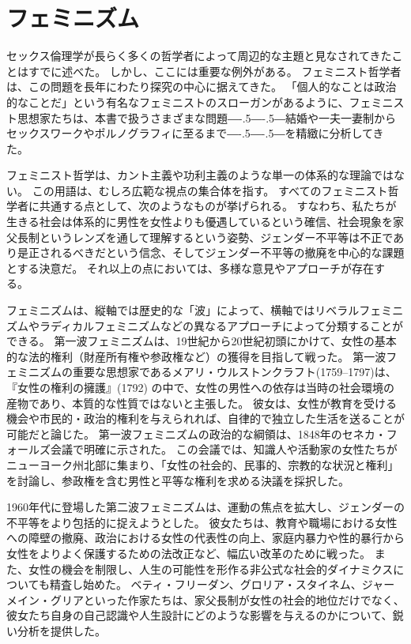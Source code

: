 \documentclass[paper=a4,book,openany]{jlreq}
\def\DDASH{―\kern-.5\zw―\kern-.5\zw―}
\begin{document}
\section{フェミニズム}

セックス倫理学が長らく多くの哲学者によって周辺的な主題と見なされてきたことはすでに述べた。
しかし、ここには重要な例外がある。
フェミニスト哲学者は、この問題を長年にわたり探究の中心に据えてきた。
「個人的なことは政治的なことだ」という有名なフェミニストのスローガンがあるように、フェミニスト思想家たちは、本書で扱うさまざまな問題{\DDASH}結婚や一夫一妻制からセックスワークやポルノグラフィに至るまで{\DDASH}を精緻に分析してきた。

フェミニスト哲学は、カント主義や功利主義のような単一の体系的な理論ではない。
この用語は、むしろ広範な視点の集合体を指す。
すべてのフェミニスト哲学者に共通する点として、次のようなものが挙げられる。
すなわち、私たちが生きる社会は体系的に男性を女性よりも優遇しているという確信、社会現象を家父長制というレンズを通して理解するという姿勢、ジェンダー不平等は不正であり是正されるべきだという信念、そしてジェンダー不平等の撤廃を中心的な課題とする決意だ。
それ以上の点においては、多様な意見やアプローチが存在する。

フェミニズムは、縦軸では歴史的な「波」によって、横軸ではリベラルフェミニズムやラディカルフェミニズムなどの異なるアプローチによって分類することができる。
第一波フェミニズムは、19世紀から20世紀初頭にかけて、女性の基本的な法的権利（財産所有権や参政権など）の獲得を目指して戦った。
第一波フェミニズムの重要な思想家であるメアリ・ウルストンクラフト(1759--1797)は、『女性の権利の擁護』(1792)\nocite{ウルストンクラーフト女性の権利}
の中で、女性の男性への依存は当時の社会環境の産物であり、本質的な性質ではないと主張した。
彼女は、女性が教育を受ける機会や市民的・政治的権利を与えられれば、自律的で独立した生活を送ることが可能だと論じた\citep{wollstonecraft93:_vindic_right_woman}。
第一波フェミニズムの政治的な綱領は、1848年のセネカ・フォールズ会議で明確に示された。
この会議では、知識人や活動家の女性たちがニューヨーク州北部に集まり、「女性の社会的、民事的、宗教的な状況と権利」を討論し、参政権を含む男性と平等な権利を求める決議を採択した\citep{parker08:_senec_falls_conven}。

1960年代に登場した第二波フェミニズムは、運動の焦点を拡大し、ジェンダーの不平等をより包括的に捉えようとした。
彼女たちは、教育や職場における女性への障壁の撤廃、政治における女性の代表性の向上、家庭内暴力や性的暴行から女性をよりよく保護するための法改正など、幅広い改革のために戦った。
また、女性の機会を制限し、人生の可能性を形作る非公式な社会的ダイナミクスについても精査し始めた。
ベティ・フリーダン、グロリア・スタイネム、ジャーメイン・グリアといった作家たちは、家父長制が女性の社会的地位だけでなく、彼女たち自身の自己認識や人生設計にどのような影響を与えるのかについて、鋭い分析を提供した。
\end{document}
